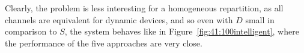 Clearly, the problem is less interesting for a homogeneous repartition, as all channels are equivalent for dynamic devices, and so even with $D$ small in comparison to $S$, the system behaves like in Figure~\ref{fig:41:100intelligent}, where the performance of the five approaches are very close.

\begin{figure}[!h]
    \centering
    \vspace*{-10pt}
\end{figure}
